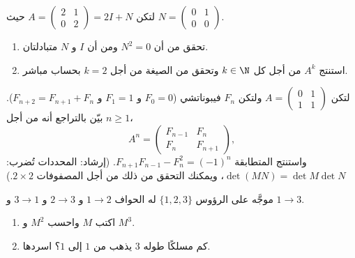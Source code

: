 \begin{exercise}[$\star\star$]\label{exo:g12:matrix:4}
لتكن $A = \begin{pmatrix} 2 & 1\\ 0 & 2\end{pmatrix} = 2I + N$ حيث
$N = \begin{pmatrix} 0 & 1\\ 0 & 0 \end{pmatrix}$.
\begin{enumerate}
  \item تحقق من أن $N^2 = 0$ ومن أن $I$ و $N$ متبادلتان.
  \item استنتج $A^k$ من أجل كل $k \in \N$ وتحقق من الصيغة من أجل $k=2$
        بحساب مباشر.
\end{enumerate}
\end{exercise}

\begin{exercise}[$\star\star$]\label{exo:g12:matrix:5}
لتكن $A = \begin{pmatrix} 0 & 1\\ 1 & 1\end{pmatrix}$ ولتكن $F_n$ 
فيبوناتشي ($F_0 = 0$ و $F_1 = 1$ و $F_{n+2} = F_{n+1} + F_n$). بيّن بالتراجع
أنه من أجل $n \geq 1$،
\[
A^n = \begin{pmatrix} F_{n-1} & F_n\\ F_n & F_{n+1}\end{pmatrix},
\]
واستنتج المتطابقة $F_{n+1}F_{n-1} - F_n^2 = (-1)^n$.
(إرشاد: المحددات تُضرب: $\det(MN) = \det M \det N$، ويمكنك
التحقق من ذلك من أجل المصفوفات $2\times2$.)
\end{exercise}

\begin{exercise}[$\star\star$]\label{exo:g12:matrix:6}
 موجَّه على الرؤوس $\{1, 2, 3\}$ له الحواف
$1\to2$ و $2\to3$ و $3\to1$ و $1\to3$.
\begin{enumerate}
  \item اكتب  $M$ واحسب $M^2$ و $M^3$.
  \item كم مسلكًا طوله $3$ يذهب من $1$ إلى $1$؟ اسردها.
\end{enumerate}
\end{exercise}

